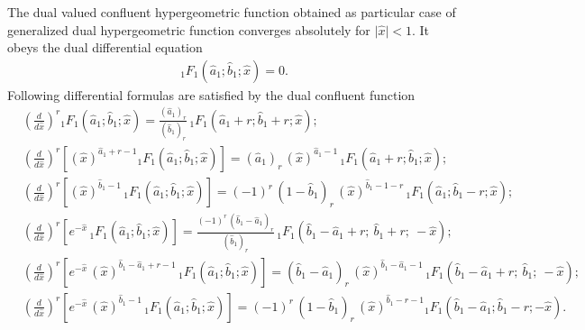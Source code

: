 \documentclass[11pt,a4paper,fleqn]{article}
\numberwithin{equation}{section}
\numberwithin{lemma}{section}
\numberwithin{theorem}{section}
\numberwithin{corollary}{section}
\begin{document}
The dual valued confluent hypergeometric function obtained as particular case of generalized dual hypergeometric function converges absolutely for $\vert \widehat{x}\vert < 1$. It obeys the dual differential equation
\begin{align}
[ \widehat{\theta} (\widehat{\theta} + \widehat{b}_1 - 1)   - \widehat{x} (\widehat{\theta} + \widehat{a}_1)  ] {}_1F_1 (\widehat{a}_1; \widehat{b}_1;  \widehat{x}) = 0.
\end{align}
Following differential formulas are satisfied by the dual confluent function
\begin{align}
		& \left(\frac{d}{d \widehat{x}}\right)^r {}_1F_1 (\widehat{a}_1; \widehat{b}_1;  \widehat{x}) = \frac{(\widehat{a}_1)_r }{(\widehat{b}_1)_r } \, {}_1F_1 (\widehat{a}_1 + r; \widehat{b}_1 + r;  \widehat{x});
		\\[5pt]
		&\left(\frac{d}{d \widehat{x}}\right)^r \left[(\widehat{x})^{\widehat{a}_1 + r - 1} {}_1F_1 (\widehat{a}_1; \widehat{b}_1;  \widehat{x})\right]  = (\widehat{a}_1)_r \, (\widehat{x})^{\widehat{a}_1 - 1} \, {}_1F_1 (\widehat{a}_1 + r; \widehat{b}_1;  \widehat{x});
		\\[5pt]
	&	\left(\frac{d}{d \widehat{x}}\right)^r \left[(\widehat{x})^{\widehat{b}_1 - 1} \, {}_1F_1 (\widehat{a}_1; \widehat{b}_1;  \widehat{x})\right] = (-1)^r \, (1 - \widehat{b}_1)_r \, (\widehat{x})^{\widehat{b}_1 - 1 - r} \, {}_1F_1 (\widehat{a}_1; \widehat{b}_1 - r;  \widehat{x});
		\\[5pt]
	&	\left(\frac{d}{d \widehat{x}}\right)^r \left[e^{-\widehat{x}} \, {}_1F_1 (\widehat{a}_1; \widehat{b}_1;  \widehat{x})\right] = \frac{(-1)^r \, (\widehat{b}_1 - \widehat{a}_1)_r}{(\widehat{b}_1)_r} \, {}_1F_1 (\widehat{b}_1 - \widehat{a}_1 + r; \ \widehat{b}_1 + r; \ -\widehat{x});
		\\[5pt]
		&\left(\frac{d}{d \widehat{x}}\right)^r \left[e^{-\widehat{x}} \, (\widehat{x})^{\widehat{b}_1 - \widehat{a}_1 + r - 1} \, {}_1F_1 (\widehat{a}_1; \widehat{b}_1;  \widehat{x})\right]  = (\widehat{b}_1 - \widehat{a}_1)_r \, (\widehat{x})^{\widehat{b}_1 - \widehat{a}_1 - 1} \,  {}_1F_1 (\widehat{b}_1 - \widehat{a}_1 + r; \ \widehat{b}_1; \ -\widehat{x});
		\\[5pt]
	&	\left(\frac{d}{d \widehat{x}}\right)^r \left[e^{-\widehat{x}} \, (\widehat{x})^{\widehat{b}_1  - 1} \, {}_1F_1 (\widehat{a}_1; \widehat{b}_1;  \widehat{x})\right]  = (-1)^r \,  (1 - \widehat{b}_1)_r \, (\widehat{x})^{\widehat{b}_1 - r - 1} {}_1F_1 (\widehat{b}_1 - \widehat{a}_1;  \widehat{b}_1 - r;  -\widehat{x}).
\end{align}
\end{document}
